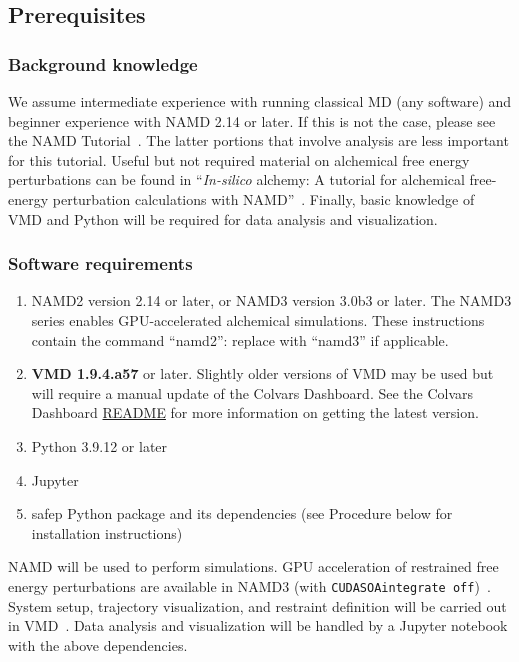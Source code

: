 \documentclass[9pt,tutorial,pubversion]{Styling/livecoms}
\newcommand{\textInput}[1]{\texttt{#1}}
\begin{document}
\subsection{Prerequisites}
    \subsubsection{Background knowledge}\label{sec:prerequisites}
    
    We assume intermediate experience with running classical MD (any software) and beginner experience with NAMD 2.14 or later. If this is not the case, please see the NAMD Tutorial~\cite{phillips2003}. The latter portions that involve analysis are less important for this tutorial. Useful but not required material on alchemical free energy perturbations can be found in “\textit{In-silico} alchemy: A tutorial for alchemical free-energy perturbation calculations with NAMD”~\cite{Henin2017}. Finally, basic knowledge of VMD and Python will be required for data analysis and visualization.  

\subsubsection{Software requirements}\label{sec:software}
    \begin{enumerate}
        \item NAMD2 version 2.14 or later, or NAMD3 version 3.0b3 or later. The NAMD3 series enables GPU-accelerated alchemical simulations. These instructions contain the command ``namd2'': replace with ``namd3'' if applicable.
        \item \textbf{VMD 1.9.4.a57} or later. Slightly older versions of VMD may be used but will require a manual update of the Colvars Dashboard. See the Colvars Dashboard \href{https://github.com/Colvars/colvars/tree/master/vmd/cv_dashboard}{README} for more information on getting the latest version.
        \item Python 3.9.12 or later
        \item Jupyter
        \item safep Python package and its dependencies (see Procedure below for installation instructions)
    \end{enumerate}

NAMD will be used to perform simulations. GPU acceleration of restrained free energy perturbations are available in NAMD3 (with \textInput{CUDASOAintegrate off})~\cite{Chen2020, Phillips2020}. System setup, trajectory visualization, and restraint definition will be carried out in VMD~\cite{Humphrey1996}. Data analysis and visualization will be handled by a Jupyter notebook with the above dependencies.
\end{document}
